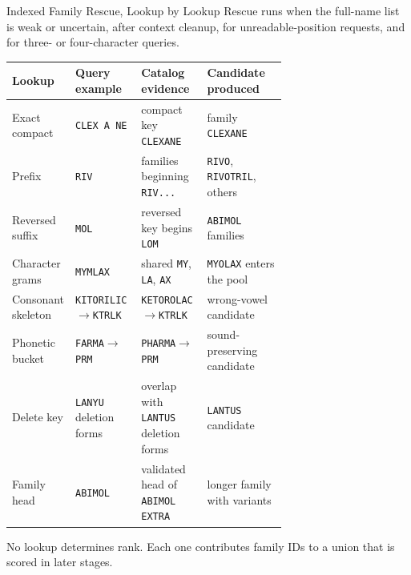 \documentclass[aspectratio=169,10pt]{beamer}
\newcommand{\code}[1]{\texttt{#1}}
\begin{document}
\begin{frame}{Indexed Family Rescue, Lookup by Lookup}
\scriptsize
Rescue runs when the full-name list is weak or uncertain, after context
cleanup, for unreadable-position requests, and for three- or four-character queries.

\begin{tabularx}{\linewidth}{@{}L{0.20\linewidth}L{0.24\linewidth}L{0.24\linewidth}Y@{}}
\toprule
\textbf{Lookup} & \textbf{Query example} & \textbf{Catalog evidence} & \textbf{Candidate produced} \\
\midrule
Exact compact & \code{CLEX A NE} & compact key \code{CLEXANE} & family \code{CLEXANE} \\
Prefix & \code{RIV} & families beginning \code{RIV...} & \code{RIVO}, \code{RIVOTRIL}, others \\
Reversed suffix & \code{MOL} & reversed key begins \code{LOM} & \code{ABIMOL} families \\
Character grams & \code{MYMLAX} & shared \code{MY}, \code{LA}, \code{AX} & \code{MYOLAX} enters the pool \\
Consonant skeleton & \code{KITORILIC}$\rightarrow$\code{KTRLK} & \code{KETOROLAC}$\rightarrow$\code{KTRLK} & wrong-vowel candidate \\
Phonetic bucket & \code{FARMA}$\rightarrow$\code{PRM} & \code{PHARMA}$\rightarrow$\code{PRM} & sound-preserving candidate \\
Delete key & \code{LANYU} deletion forms & overlap with \code{LANTUS} deletion forms & \code{LANTUS} candidate \\
Family head & \code{ABIMOL} & validated head of \code{ABIMOL EXTRA} & longer family with variants \\
\bottomrule
\end{tabularx}

\vspace{1mm}
No lookup determines rank. Each one contributes family IDs to a union that is
scored in later stages.
\end{frame}
\end{document}

